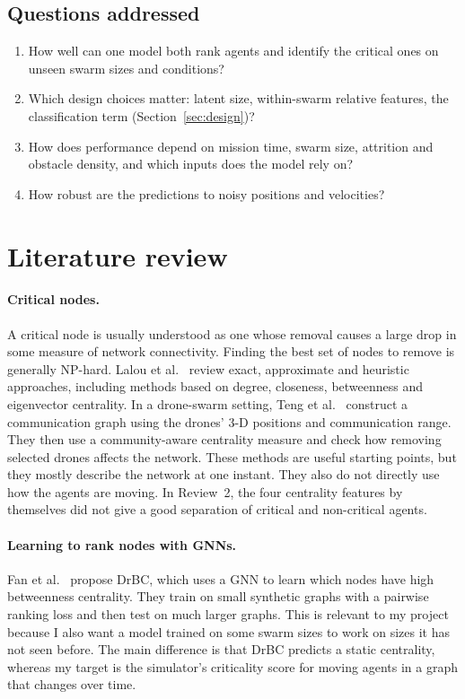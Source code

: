 \documentclass[11pt,a4paper]{article}
\begin{document}
\subsection{Questions addressed}
\begin{enumerate}[label=\arabic*.]
\item How well can one model both rank agents and identify the critical ones on unseen swarm sizes and conditions?
\item Which design choices matter: latent size, within-swarm relative features, the classification term (Section~\ref{sec:design})?
\item How does performance depend on mission time, swarm size, attrition and obstacle density, and which inputs does the model rely on?
\item How robust are the predictions to noisy positions and velocities?
\end{enumerate}

\section{Literature review}\label{sec:lit}

\paragraph{Critical nodes.} A critical node is usually understood as one whose removal causes a large drop in some measure
of network connectivity. Finding the best set of nodes to remove is generally NP-hard. Lalou et al.\ \cite{lalou2018cndp}
review exact, approximate and heuristic approaches, including methods based on degree, closeness, betweenness and
eigenvector centrality. In a drone-swarm setting, Teng et al.\ \cite{teng2024drones} construct a communication graph
using the drones' 3-D positions and communication range. They then use a community-aware centrality measure and check
how removing selected drones affects the network. These methods are useful starting points, but they mostly describe
the network at one instant. They also do not directly use how the agents are moving. In Review~2, the four centrality
features by themselves did not give a good separation of critical and non-critical agents.

\paragraph{Learning to rank nodes with GNNs.} Fan et al.\ \cite{fan2019drbc} propose DrBC, which uses a GNN to learn
which nodes have high betweenness centrality. They train on small synthetic graphs with a pairwise ranking loss and
then test on much larger graphs. This is relevant to my project because I also want a model trained on some swarm
sizes to work on sizes it has not seen before. The main difference is that DrBC predicts a static centrality,
whereas my target is the simulator's criticality score for moving agents in a graph that changes over time.
\end{document}
